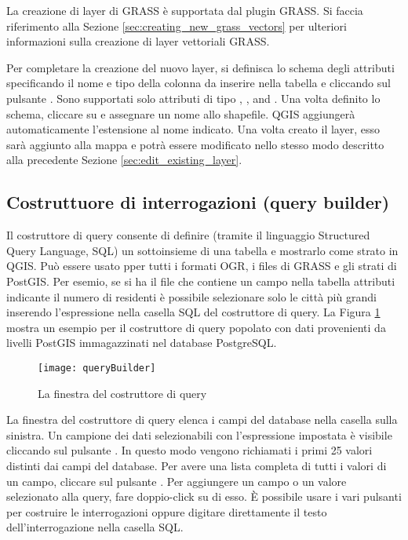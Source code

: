 La creazione di layer di GRASS è supportata dal plugin GRASS. Si faccia
riferimento alla Sezione \ref{sec:creating_new_grass_vectors} per ulteriori
informazioni sulla creazione di layer vettoriali GRASS.

Per completare la creazione del nuovo layer, si definisca lo schema degli
attributi specificando il nome e tipo della colonna da inserire nella tabella
e cliccando sul pulsante . Sono supportati solo
attributi di tipo , , and
. Una volta definito lo schema, cliccare su
 e assegnare un nome allo shapefile.
QGIS aggiungerà automaticamente l'estensione  al nome indicato.
Una volta creato il layer, esso sarà aggiunto alla mappa e potrà essere
modificato nello stesso modo descritto alla precedente Sezione \ref{sec:edit_existing_layer}. 

\subsection{Costruttuore di interrogazioni (query builder)}\label{sec:query_builder}

Il costruttore di query consente di definire (tramite il linguaggio Structured
Query Language, SQL) un sottoinsieme di una tabella e mostrarlo come strato in
QGIS. Può essere usato pper tutti i formati OGR, i files di GRASS e gli strati
di PostGIS. 
Per esemio, se si ha il file  che contiene un campo
 nella tabella attributi indicante il numero di residenti
è possibile selezionare solo le città più grandi inserendo l'espressione
 nella casella SQL del costruttore di query. La
Figura \ref{fig:query_builder} mostra un esempio per il costruttore di query
popolato con dati provenienti da livelli PostGIS immagazzinati nel database PostgreSQL. 

\begin{figure}[ht]
  \begin{center}
    \caption{La finestra del costruttore di query \nixcaption}\label{fig:query_builder}\smallskip
    \texttt{[image: queryBuilder]}
  \end{center}  
\end{figure}

La finestra del costruttore di query elenca i campi del
database nella casella sulla sinistra. Un campione dei dati selezionabili con
l'espressione impostata è visibile cliccando sul pulsante  . In questo modo vengono richiamati i primi 25
valori distinti dai campi del database. Per avere una lista completa di tutti
i valori di un campo, cliccare sul pulsante  . Per aggiungere un campo o un valore selezionato alla query, fare
doppio-click su di esso. È possibile usare
i vari pulsanti per costruire le interrogazioni oppure digitare direttamente
il testo dell'interrogazione nella casella SQL.

